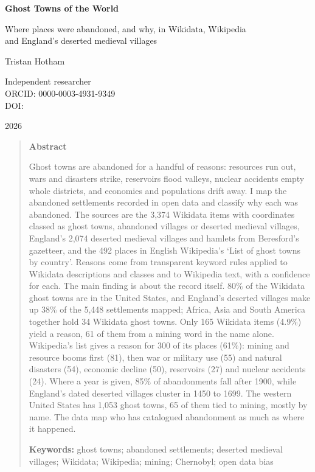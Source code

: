\documentclass[11pt,a4paper]{article}
\begin{document}
\begin{center}
{\Large\bfseries Ghost Towns of the World\par}
\vspace{0.4em}
{\large Where places were abandoned, and why, in Wikidata, Wikipedia\\and England's deserted medieval villages\par}
\vspace{1.2em}
{\large Tristan Hotham\par}
\vspace{0.3em}
{\small Independent researcher\\
ORCID: 0000-0003-4931-9349\\
DOI: \par}
\vspace{0.8em}
2026
\end{center}

\begin{quote}
\small
\begin{center}\textbf{Abstract}\end{center}
Ghost towns are abandoned for a handful of reasons: resources run out, wars and disasters strike, reservoirs flood valleys, nuclear accidents empty whole districts, and economies and populations drift away. I map the abandoned settlements recorded in open data and classify why each was abandoned. The sources are the 3,374 Wikidata items with coordinates classed as ghost towns, abandoned villages or deserted medieval villages, England's 2,074 deserted medieval villages and hamlets from Beresford's gazetteer, and the 492 places in English Wikipedia's `List of ghost towns by country'. Reasons come from transparent keyword rules applied to Wikidata descriptions and classes and to Wikipedia text, with a confidence for each. The main finding is about the record itself. 80\% of the Wikidata ghost towns are in the United States, and England's deserted villages make up 38\% of the 5,448 settlements mapped; Africa, Asia and South America together hold 34 Wikidata ghost towns. Only 165 Wikidata items (4.9\%) yield a reason, 61 of them from a mining word in the name alone. Wikipedia's list gives a reason for 300 of its places (61\%): mining and resource booms first (81), then war or military use (55) and natural disasters (54), economic decline (50), reservoirs (27) and nuclear accidents (24). Where a year is given, 85\% of abandonments fall after 1900, while England's dated deserted villages cluster in 1450 to 1699. The western United States has 1,053 ghost towns, 65 of them tied to mining, mostly by name. The data map who has catalogued abandonment as much as where it happened.

\textbf{Keywords:} ghost towns; abandoned settlements; deserted medieval villages; Wikidata; Wikipedia; mining; Chernobyl; open data bias
\end{quote}
\end{document}

